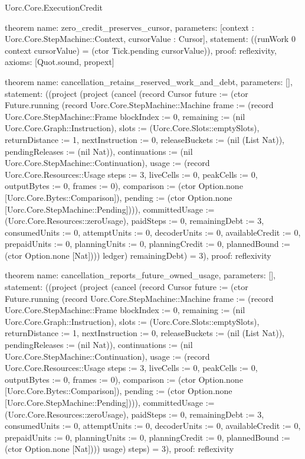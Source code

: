 \begin{lexlean}{Uorc.Core.ExecutionCredit}
\begin{semanticmodule}
theorem{
  name: zero_credit_preserves_cursor,
  parameters: [context : Uorc.Core.StepMachine::Context, cursorValue : Cursor],
  statement: ((runWork 0 context cursorValue) = (ctor Tick.pending cursorValue)),
  proof: reflexivity{},
  axioms: [Quot.sound, propext]
}

theorem{
  name: cancellation_retains_reserved_work_and_debt,
  parameters: [],
  statement: ((project (project (cancel (record Cursor {future := (ctor Future.running (record Uorc.Core.StepMachine::Machine {frame := (record Uorc.Core.StepMachine::Frame {blockIndex := 0, remaining := (nil Uorc.Core.Graph::Instruction), slots := (Uorc.Core.Slots::emptySlots), returnDistance := 1, nextInstruction := 0, releaseBuckets := (nil (List Nat)), pendingReleases := (nil Nat)}), continuations := (nil Uorc.Core.StepMachine::Continuation), usage := (record Uorc.Core.Resources::Usage {steps := 3, liveCells := 0, peakCells := 0, outputBytes := 0, frames := 0}), comparison := (ctor Option.none [Uorc.Core.Bytes::Comparison]), pending := (ctor Option.none [Uorc.Core.StepMachine::Pending])})), committedUsage := (Uorc.Core.Resources::zeroUsage), paidSteps := 0, remainingDebt := 3, consumedUnits := 0, attemptUnits := 0, decoderUnits := 0, availableCredit := 0, prepaidUnits := 0, planningUnits := 0, planningCredit := 0, plannedBound := (ctor Option.none [Nat])})) ledger) remainingDebt) = 3),
  proof: reflexivity{}
}

theorem{
  name: cancellation_reports_future_owned_usage,
  parameters: [],
  statement: ((project (project (cancel (record Cursor {future := (ctor Future.running (record Uorc.Core.StepMachine::Machine {frame := (record Uorc.Core.StepMachine::Frame {blockIndex := 0, remaining := (nil Uorc.Core.Graph::Instruction), slots := (Uorc.Core.Slots::emptySlots), returnDistance := 1, nextInstruction := 0, releaseBuckets := (nil (List Nat)), pendingReleases := (nil Nat)}), continuations := (nil Uorc.Core.StepMachine::Continuation), usage := (record Uorc.Core.Resources::Usage {steps := 3, liveCells := 0, peakCells := 0, outputBytes := 0, frames := 0}), comparison := (ctor Option.none [Uorc.Core.Bytes::Comparison]), pending := (ctor Option.none [Uorc.Core.StepMachine::Pending])})), committedUsage := (Uorc.Core.Resources::zeroUsage), paidSteps := 0, remainingDebt := 3, consumedUnits := 0, attemptUnits := 0, decoderUnits := 0, availableCredit := 0, prepaidUnits := 0, planningUnits := 0, planningCredit := 0, plannedBound := (ctor Option.none [Nat])})) usage) steps) = 3),
  proof: reflexivity{}
}


\end{semanticmodule}
\end{lexlean}

